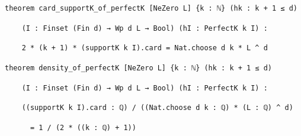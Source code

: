 \documentclass[11pt,a4paper]{article}
\theoremstyle{named}
\begin{document}
\begin{leancode}
\item \texttt{theorem\ \allowbreak{}card\_\allowbreak{}supportK\_\allowbreak{}of\_\allowbreak{}perfectK\ \allowbreak{}[NeZero\ \allowbreak{}L]\ \allowbreak{}\{k\ \allowbreak{}:\ \allowbreak{}ℕ\}\ \allowbreak{}(hk\ \allowbreak{}:\ \allowbreak{}k\ \allowbreak{}+\ \allowbreak{}1\ \allowbreak{}≤\ \allowbreak{}d)}
\item \texttt{\ \allowbreak{}\ \allowbreak{}\ \allowbreak{}\ \allowbreak{}(I\ \allowbreak{}:\ \allowbreak{}Finset\ \allowbreak{}(Fin\ \allowbreak{}d)\ \allowbreak{}→\ \allowbreak{}Wp\ \allowbreak{}d\ \allowbreak{}L\ \allowbreak{}→\ \allowbreak{}Bool)\ \allowbreak{}(hI\ \allowbreak{}:\ \allowbreak{}PerfectK\ \allowbreak{}k\ \allowbreak{}I)\ \allowbreak{}:}
\item \texttt{\ \allowbreak{}\ \allowbreak{}\ \allowbreak{}\ \allowbreak{}2\ \allowbreak{}*\ \allowbreak{}(k\ \allowbreak{}+\ \allowbreak{}1)\ \allowbreak{}*\ \allowbreak{}(supportK\ \allowbreak{}k\ \allowbreak{}I).\allowbreak{}card\ \allowbreak{}=\ \allowbreak{}Nat.\allowbreak{}choose\ \allowbreak{}d\ \allowbreak{}k\ \allowbreak{}*\ \allowbreak{}L\ \allowbreak{}\textasciicircum{}\ \allowbreak{}d}
\smallskip
\item \texttt{theorem\ \allowbreak{}density\_\allowbreak{}of\_\allowbreak{}perfectK\ \allowbreak{}[NeZero\ \allowbreak{}L]\ \allowbreak{}\{k\ \allowbreak{}:\ \allowbreak{}ℕ\}\ \allowbreak{}(hk\ \allowbreak{}:\ \allowbreak{}k\ \allowbreak{}+\ \allowbreak{}1\ \allowbreak{}≤\ \allowbreak{}d)}
\item \texttt{\ \allowbreak{}\ \allowbreak{}\ \allowbreak{}\ \allowbreak{}(I\ \allowbreak{}:\ \allowbreak{}Finset\ \allowbreak{}(Fin\ \allowbreak{}d)\ \allowbreak{}→\ \allowbreak{}Wp\ \allowbreak{}d\ \allowbreak{}L\ \allowbreak{}→\ \allowbreak{}Bool)\ \allowbreak{}(hI\ \allowbreak{}:\ \allowbreak{}PerfectK\ \allowbreak{}k\ \allowbreak{}I)\ \allowbreak{}:}
\item \texttt{\ \allowbreak{}\ \allowbreak{}\ \allowbreak{}\ \allowbreak{}((supportK\ \allowbreak{}k\ \allowbreak{}I).\allowbreak{}card\ \allowbreak{}:\ \allowbreak{}ℚ)\ \allowbreak{}/\ \allowbreak{}((Nat.\allowbreak{}choose\ \allowbreak{}d\ \allowbreak{}k\ \allowbreak{}:\ \allowbreak{}ℚ)\ \allowbreak{}*\ \allowbreak{}(L\ \allowbreak{}:\ \allowbreak{}ℚ)\ \allowbreak{}\textasciicircum{}\ \allowbreak{}d)}
\item \texttt{\ \allowbreak{}\ \allowbreak{}\ \allowbreak{}\ \allowbreak{}\ \allowbreak{}\ \allowbreak{}=\ \allowbreak{}1\ \allowbreak{}/\ \allowbreak{}(2\ \allowbreak{}*\ \allowbreak{}((k\ \allowbreak{}:\ \allowbreak{}ℚ)\ \allowbreak{}+\ \allowbreak{}1))}

\end{leancode}
\end{document}
